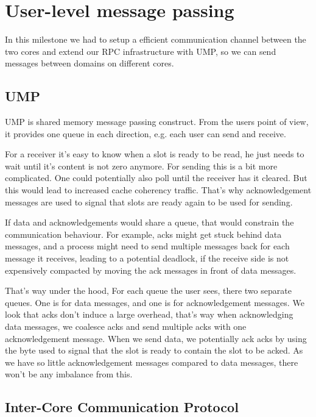 \chapter{User-level message passing}

In this milestone we had to setup a efficient communication channel between
the two cores and extend our RPC infrastructure with UMP, so we can send messages
between domains on different cores.

\section{UMP}

UMP is shared memory message passing construct.
From the users point of view, it provides one queue in each direction, e.g. each
user can send and receive.

For a receiver it's easy to know when a slot is ready to be read, he just needs
to wait until it's content is not zero anymore.
For sending this is a bit more complicated.
One could potentially also poll until the receiver has it cleared.
But this would lead to increased cache coherency traffic.
That's why acknowledgement messages are used to signal that slots are ready
again to be used for sending.

If data and acknowledgements would share a queue, that would constrain the
communication behaviour.
For example, acks might get stuck behind data messages, and a process might need
to send multiple messages back for each message it receives, leading to a
potential deadlock, if the receive side is not expensively compacted by moving
the ack messages in front of data messages.

That's way under the hood, For each queue the user sees, there two separate
queues.
One is for data messages, and one is for acknowledgement messages.
We look that acks don't induce a large overhead, that's way when acknowledging
data messages, we coalesce acks and send multiple acks with one acknowledgement
message.
When we send data, we potentially ack acks by using
the byte used to signal that the slot is ready to contain the slot to be acked.
As we have so little acknowledgement messages compared to data messages, there
won't be any imbalance from this.

\section{Inter-Core Communication Protocol}

